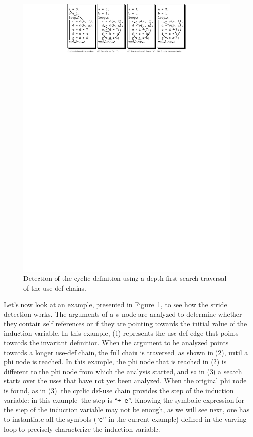 \begin{figure}[h]
  \begin{center}
    \includegraphics[width=1.2\textwidth]{iv_step}
  \end{center}
  \vspace{-50em}
  \caption{Detection of the cyclic definition using a depth first
    search traversal of the use-def chains.}
  \label{spop:fig:ivstep}
\end{figure}

Let's now look at an example, presented in
Figure~\ref{spop:fig:ivstep}, to see how the stride detection works.
The arguments of a $\phi$-node are analyzed to determine whether they
contain self references or if they are pointing towards the initial
value of the induction variable.  In this example, (1) represents the
use-def edge that points towards the invariant definition.  When the
argument to be analyzed points towards a longer use-def chain, the
full chain is traversed, as shown in (2), until a phi node is reached.
In this example, the phi node that is reached in (2) is different to
the phi node from which the analysis started, and so in (3) a search
starts over the uses that have not yet been analyzed.  When the
original phi node is found, as in (3), the cyclic def-use chain
provides the step of the induction variable: in this example, the step
is ``\texttt{+ e}''.  Knowing the symbolic expression for the step of
the induction variable may not be enough, as we will see next, one has
to instantiate all the symbols (``\texttt{e}'' in the current example)
defined in the varying loop to precisely characterize the induction
variable.

